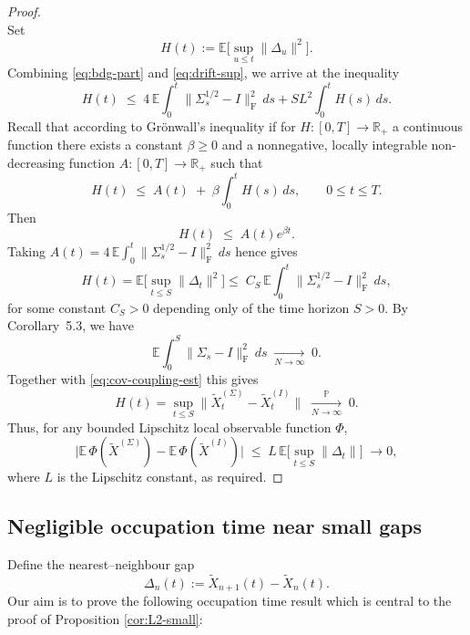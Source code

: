 \documentclass[12pt,reqno]{amsart}
\theoremstyle{plain}
\theoremstyle{definition}
\theoremstyle{remark}
\begin{document}
\begin{proof}
\begin{equation}
\end{equation}
Set 
\begin{equation}
H(t) := \mathbb E\Big[\sup_{u\le t}\|\Delta_u\|^2\Big].
\end{equation}
Combining \eqref{eq:bdg-part} and \eqref{eq:drift-sup}, we arrive at the inequality
\begin{equation}\label{eq:Ht}
H(t) \;\le\; 4 \,\mathbb E\!\int_0^t \|\Sigma_s^{1/2}-I\|_{\mathrm F}^2\,ds
+ SL^2 \int_0^t H(s)\,ds .
\end{equation}
Recall that according to Gr\"onwall's inequality if for $H:[0,T]\to \mathbb R_+$ a continuous function there exists a constant $\beta \ge 0$ and a nonnegative, locally integrable non-decreasing function 
$A:[0,T]\to\mathbb R_+$ such that
\begin{equation}
H(t) \;\le\; A(t) \;+\; \beta \int_0^t H(s)\,ds,
\qquad 0 \le t \le T.
\end{equation}
Then
\begin{equation}
H(t) \;\le\; A(t) e^{\beta t}.
\end{equation}
Taking $A(t)=4\,\mathbb E\!\int_{0}^{t}\|\Sigma_{s}^{1/2}-I\|_{\mathrm F}^{2}\,ds$ hence gives 
\begin{equation}
\label{eq:cov-coupling-est}
H(t)=\mathbb E\Big[\sup_{t\le S}\|\Delta_t\|^2\Big] \le\; C_S \,\mathbb E\!\int_{0}^{t}\|\Sigma_{s}^{1/2}-I\|_{\mathrm F}^{2}\,ds,
\end{equation}
for some constant $C_S>0$ depending only of the time horizon $S>0$. By Corollary~5.3, we have 
\begin{equation}
\mathbb E\!\int_0^S \|\Sigma_s-I\|_{\mathrm F}^2\,ds \;\xrightarrow[N\to\infty]{}\;0.
\end{equation}
Together with \eqref{eq:cov-coupling-est} this gives
\begin{equation}
H(t)=\sup_{t\le S}\|\widetilde X^{(\Sigma)}_t-\widetilde X^{(I)}_t\|
\;\xrightarrow[N\to\infty]{\mathbb P}\;0 .
\end{equation}
Thus, for any bounded Lipschitz local observable function $\Phi$,
\begin{equation}
\Big|\mathbb E\,\Phi(\widetilde X^{(\Sigma)}) -
\mathbb E\,\Phi(\widetilde X^{(I)})\Big|
\;\le\; L\,\mathbb E\!\big[\sup_{t\le S}\|\Delta_t\|\big]\;\to 0,
\end{equation}
where $L$ is the Lipschitz constant, as required.
\end{proof}



\subsection{Negligible occupation time near small gaps} 
Define the nearest–neighbour gap
\begin{equation}
\Delta_n(t):=\widetilde X_{n+1}(t)-\widetilde X_n(t).
\end{equation} Our aim is to prove the following occupation time result which is central to the proof of Proposition \ref{cor:L2-small}:
\end{document}
